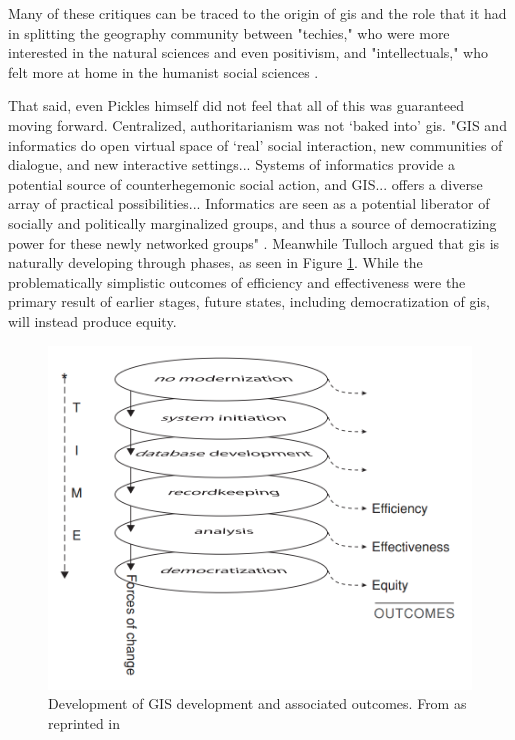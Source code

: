 Many of these critiques can be traced to the origin of \ac{gis} and the role that it had in splitting the geography community between "techies," who were more interested in the natural sciences and even positivism, and "intellectuals," who felt more at home in the humanist social sciences \cite{sheppardGISSocietyResearch1995}.

That said, even Pickles himself did not feel that all of this was guaranteed moving forward. Centralized, authoritarianism was not `baked into' \ac{gis}. "GIS and informatics do open virtual space of `real' social interaction, new communities of dialogue, and new interactive settings... Systems of informatics provide a potential source of counterhegemonic social action, and GIS... offers a diverse array of practical possibilities... Informatics are seen as a potential liberator of socially and politically marginalized groups, and thus a source of democratizing power for these newly networked groups" \cite{picklesRepresentationsElectronicAge1994}. Meanwhile Tulloch argued that \ac{gis} is naturally developing through phases, as seen in Figure \ref{fig:gis_equity}. While the problematically simplistic outcomes of efficiency and effectiveness were the primary result of earlier stages, future states, including democratization of \ac{gis}, will instead produce equity. 

\begin{figure}[!htb]
	\centering
	\includegraphics[scale=0.3]{Figures/chap2/gis_equity.png}
	\caption[Development of GIS development and associated outcomes]{Development of GIS development and associated outcomes. From \cite{tullochTheoreticalModelMultipurpose1999} as reprinted in \cite{tullochInstitutionalGeographicInformation2007}}
	\label{fig:gis_equity}
\end{figure}


